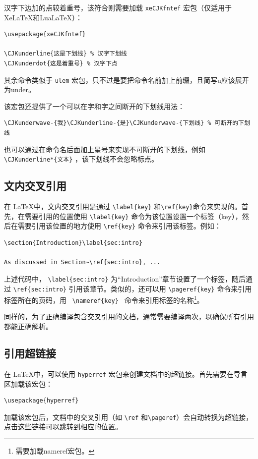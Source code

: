 汉字下边加的点较着重号，该符合则需要加载 \verb|xeCJKfntef| 宏包（仅适用于XeLaTeX和LuaLaTeX）：
\begin{verbatim}
\usepackage{xeCJKfntef}

\CJKunderline{这是下划线} % 汉字下划线
\CJKunderdot{这是着重号} % 汉字下点
\end{verbatim}
其余命令类似于 \verb|ulem| 宏包，只不过是要把命令名前加上前缀，且简写u应该展开为under。

该宏包还提供了一个可以在字和字之间断开的下划线用法：
\begin{verbatim}
\CJKunderwave-{我}\CJKunderline-{是}\CJKunderwave-{下划线} % 可断开的下划线
\end{verbatim}
也可以通过在命令名后面加上星号来实现不可断开的下划线，例如 \verb|\CJKunderline*{文本}| ，该下划线不会忽略标点。

\subsection{文内交叉引用}

在 \LaTeX 中，文内交叉引用是通过 \verb|\label{key}| 和\verb|\ref{key}|命令来实现的。首先，在需要引用的位置使用 \verb|\label{key}| 命令为该位置设置一个标签（key），然后在需要引用该位置的地方使用 \verb|\ref{key}| 命令来引用该标签。例如：
\begin{verbatim}
\section{Introduction}\label{sec:intro}

As discussed in Section~\ref{sec:intro}, ...
\end{verbatim}
上述代码中， \verb|\label{sec:intro}| 为“Introduction”章节设置了一个标签，随后通过 \verb|\ref{sec:intro}| 引用该章节。类似的，还可以用 \verb|\pageref{key}| 命令来引用标签所在的页码，用 \verb| \nameref{key} | 命令来引用标签的名称\footnote{需要加载nameref宏包。}。

同样的，为了正确编译包含交叉引用的文档，通常需要编译两次，以确保所有引用都能正确解析。

\subsection{引用超链接}

在 \LaTeX 中，可以使用 \verb|hyperref| 宏包来创建文档中的超链接。首先需要在导言区加载该宏包：
\begin{verbatim}
\usepackage{hyperref}
\end{verbatim}
加载该宏包后，文档中的交叉引用（如 \verb|\ref| 和\verb|\pageref|）会自动转换为超链接，点击这些链接可以跳转到相应的位置。

